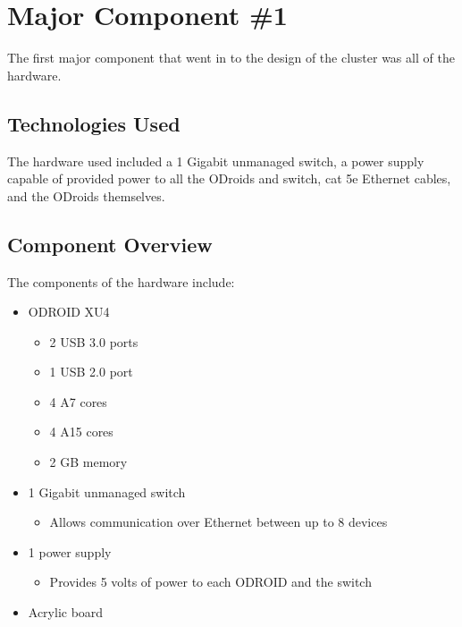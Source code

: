 \section{Major Component \#1 }

The first major component that went in to the design of the cluster was all of the hardware. 

\subsection{Technologies  Used}

The hardware used included a 1 Gigabit unmanaged switch, a power supply capable of provided power to all the ODroids and switch, cat 5e Ethernet cables, and the ODroids themselves. 

\subsection{Component  Overview}

The components of the hardware include:

\begin{itemize}
	\item ODROID XU4
	\begin{itemize}
		\item 2 USB 3.0 ports
		\item 1 USB 2.0 port
		\item 4 A7 cores
		\item 4 A15 cores
		\item 2 GB memory
	\end{itemize}
	\item 1 Gigabit unmanaged switch
	\begin{itemize}
		\item Allows communication over Ethernet between up to 8 devices
	\end{itemize}
	\item 1 power supply
	\begin{itemize}
		\item Provides 5 volts of power to each ODROID and the switch
	\end{itemize}
	\item Acrylic board
\end{itemize}

